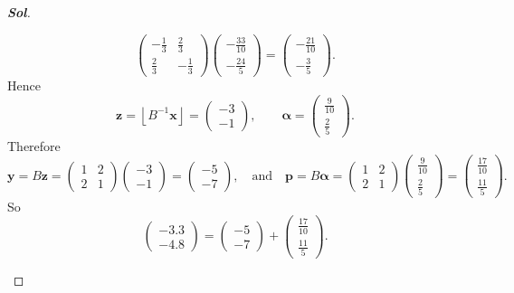 \begin{enumerate}
\begin{proof}[\normalfont\color{magenta}\bfseries Sol]
\begin{enumerate}
\[\begin{pmatrix}
			-\frac13&\frac23\\[4pt]
			\frac23&-\frac13
		\end{pmatrix}
		\begin{pmatrix}
			-\frac{33}{10}\\[2pt]
			-\frac{24}{5}
		\end{pmatrix}
		=
		\begin{pmatrix}
			-\frac{21}{10}\\[2pt]
			-\frac35
		\end{pmatrix}.
		\]
		Hence
		\[
		\mathbf z=\left\lfloor B^{-1}\mathbf x\right\rfloor
		=
		\begin{pmatrix}
			-3\\
			-1
		\end{pmatrix},
		\qquad
		\boldsymbol\alpha
		=
		\begin{pmatrix}
			\frac9{10}\\[2pt]
			\frac25
		\end{pmatrix}.
		\]
		Therefore
		\[
		\mathbf y=B\mathbf z
		=
		\begin{pmatrix}
			1&2\\
			2&1
		\end{pmatrix}
		\begin{pmatrix}
			-3\\
			-1
		\end{pmatrix}
		=
		\begin{pmatrix}
			-5\\
			-7
		\end{pmatrix},\quad\text{and}\quad
		\mathbf p=B\boldsymbol\alpha
		=
		\begin{pmatrix}
			1&2\\
			2&1
		\end{pmatrix}
		\begin{pmatrix}
			\frac9{10}\\[2pt]
			\frac25
		\end{pmatrix}
		=
		\begin{pmatrix}
			\frac{17}{10}\\[2pt]
			\frac{11}{5}
		\end{pmatrix}.
		\]
		So
		\[
		\boxed{
			\begin{pmatrix}
				-3.3\\
				-4.8
			\end{pmatrix}
			=
			\begin{pmatrix}
				-5\\
				-7
			\end{pmatrix}
			+
			\begin{pmatrix}
				\frac{17}{10}\\[2pt]
				\frac{11}{5}
			\end{pmatrix}.
		}
		\]
	\end{enumerate}
	\end{proof}


\end{enumerate}
